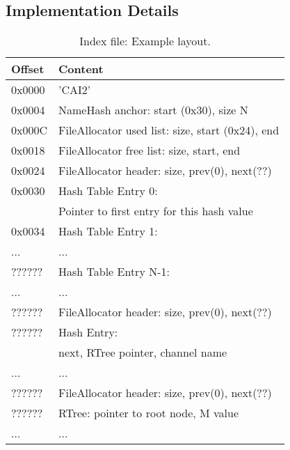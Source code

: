 \subsection{Implementation Details}

\begin{table}[htbp]
  \begin{center}
    \sffamily
    \begin{tabular}{ll}
     Offset  & Content \\
     \hline
     0x0000  & 'CAI2' \\
     0x0004  & NameHash anchor: start (0x30), size N \\
     0x000C  & FileAllocator used list: size, start (0x24), end \\
     0x0018  & FileAllocator free list: size, start, end \\
     0x0024  & FileAllocator header: size, prev(0), next(??) \\
     0x0030  & Hash Table Entry 0: \\
             & Pointer to first entry for this hash value \\
     0x0034  & Hash Table Entry 1:  \\
     ...     & ... \\
     ??????  & Hash Table Entry N-1:  \\
     ...     & ... \\
     ??????  & FileAllocator header: size, prev(0), next(??) \\
     ??????  & Hash Entry: \\
             & next, RTree pointer, channel name \\
     ...     & ... \\  
     ??????  & FileAllocator header: size, prev(0), next(??) \\
     ??????  & RTree: pointer to root node, M value \\
     ...     & ... \\  
    \end{tabular}
    \caption{Index file: Example layout.}
    \label{tab:indexfile}
  \end{center}
\end{table}

